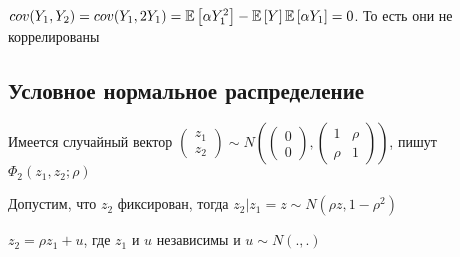 \documentclass[a4paper, 10pt]{article}
\begin{document}
$cov(Y_1,Y_2)=cov(Y_1,2Y_1)=\mathbb{E}\left[\alpha Y_1^2\right]-\mathbb{E}\left[Y\right]\mathbb{E}\left[\alpha Y_1\right]=0$. То есть они не коррелированы


\subsection{Условное нормальное распределение}
Имеется случайный вектор $\begin{pmatrix}
    z_1\\
    z_2
\end{pmatrix}\sim N\left(\begin{pmatrix}
    0\\
    0
\end{pmatrix},\begin{pmatrix}
    1&\rho\\
    \rho&1
\end{pmatrix}\right)$, пишут $\Phi_2(z_1,z_2;\rho)$

Допустим, что $z_2$ фиксирован, тогда $z_2|z_1=z\sim N(\rho z,1-\rho^2)$

$z_2=\rho z_1+u$, где $z_1$ и $u$ независимы и $u\sim N(.,.)$
\end{document}
